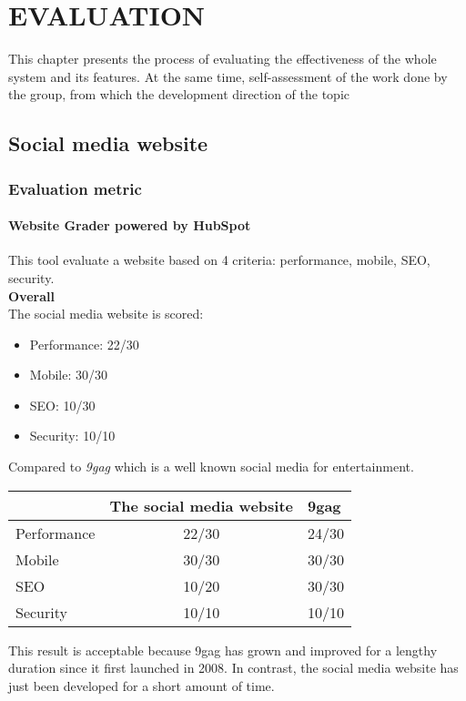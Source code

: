 \chapter{EVALUATION}
This chapter presents the process of evaluating the effectiveness of the whole system and its features. At the same time, self-assessment of the work done by the group, from which the development direction of the topic
\section{Social media website}
\subsection{Evaluation metric}
\subsubsection{Website Grader powered by HubSpot}
This tool evaluate a website based on 4 criteria: performance, mobile, SEO, security.\\
\textbf{Overall}\\
The social media website is scored:
\begin{itemize}
\item Performance: 22/30
\item Mobile: 30/30
\item SEO: 10/30
\item Security: 10/10
\end{itemize}
Compared to \textit{9gag} which is a well known social media for entertainment. 
\begin{table}[H]
\begin{tabular}{|l|c|l|}
\hline
            & \multicolumn{1}{l|}{The social media website} & 9gag  \\ \hline
Performance & 22/30                                         & 24/30 \\ \hline
Mobile      & 30/30                                         & 30/30 \\ \hline
SEO         & 10/20                                         & 30/30 \\ \hline
Security    & 10/10                                         & 10/10 \\ \hline
\end{tabular}
\end{table}
This result is acceptable because 9gag has grown and improved for a lengthy duration since it first launched in 2008. In contrast, the social media website has just been developed for a short amount of time.\\
